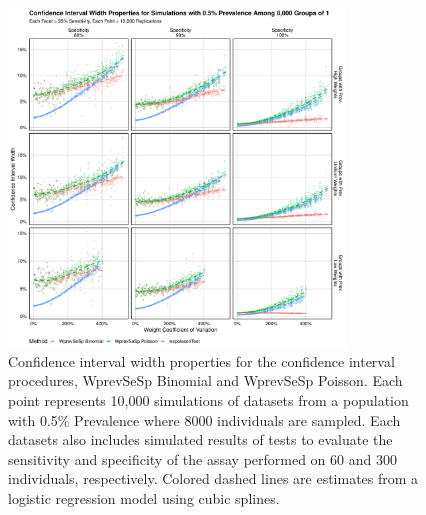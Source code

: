 \documentclass[AMA,STIX1COL]{WileyNJD-v2}
\begin{document}
\begin{figure}
\centering
\includegraphics[width=0.8\textwidth]{figures/imperfect_confidence_interval_width_8000_groups_0_005_prev}
\caption{Confidence interval width properties for the confidence interval procedures, WprevSeSp Binomial and WprevSeSp Poisson.
Each point represents 10,000 simulations of datasets from a population with 0.5\% Prevalence where 8000 individuals are sampled.
Each datasets also includes simulated results of tests to evaluate the sensitivity and specificity of the assay performed on 60 and 300 individuals, respectively.
Colored dashed lines are estimates from a logistic regression model using cubic splines.}
\label{fig:imperfect_confidence_interval_width_8000_groups_0_005_prev}
\end{figure}
\end{document}
